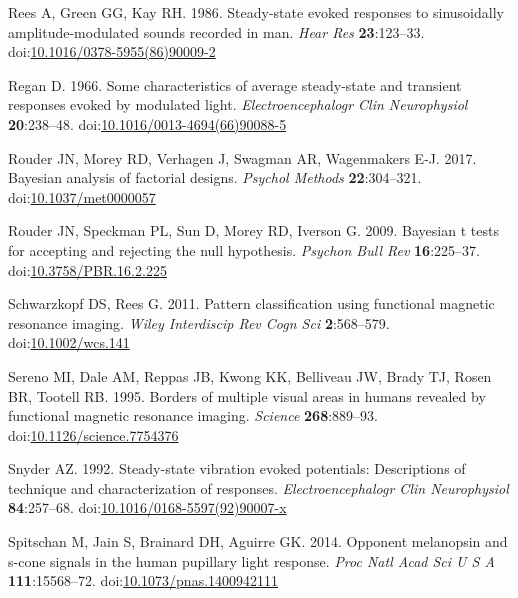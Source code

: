 \documentclass[]{article}
\begin{document}
\leavevmode\hypertarget{ref-Rees1986}{}%
Rees A, Green GG, Kay RH. 1986. Steady-state evoked responses to sinusoidally amplitude-modulated sounds recorded in man. \emph{Hear Res} \textbf{23}:123--33. doi:\href{https://doi.org/10.1016/0378-5955(86)90009-2}{10.1016/0378-5955(86)90009-2}

\leavevmode\hypertarget{ref-Regan1966}{}%
Regan D. 1966. Some characteristics of average steady-state and transient responses evoked by modulated light. \emph{Electroencephalogr Clin Neurophysiol} \textbf{20}:238--48. doi:\href{https://doi.org/10.1016/0013-4694(66)90088-5}{10.1016/0013-4694(66)90088-5}

\leavevmode\hypertarget{ref-Rouder2017}{}%
Rouder JN, Morey RD, Verhagen J, Swagman AR, Wagenmakers E-J. 2017. Bayesian analysis of factorial designs. \emph{Psychol Methods} \textbf{22}:304--321. doi:\href{https://doi.org/10.1037/met0000057}{10.1037/met0000057}

\leavevmode\hypertarget{ref-Rouder2009}{}%
Rouder JN, Speckman PL, Sun D, Morey RD, Iverson G. 2009. Bayesian t tests for accepting and rejecting the null hypothesis. \emph{Psychon Bull Rev} \textbf{16}:225--37. doi:\href{https://doi.org/10.3758/PBR.16.2.225}{10.3758/PBR.16.2.225}

\leavevmode\hypertarget{ref-Schwarzkopf2011}{}%
Schwarzkopf DS, Rees G. 2011. Pattern classification using functional magnetic resonance imaging. \emph{Wiley Interdiscip Rev Cogn Sci} \textbf{2}:568--579. doi:\href{https://doi.org/10.1002/wcs.141}{10.1002/wcs.141}

\leavevmode\hypertarget{ref-Sereno1995}{}%
Sereno MI, Dale AM, Reppas JB, Kwong KK, Belliveau JW, Brady TJ, Rosen BR, Tootell RB. 1995. Borders of multiple visual areas in humans revealed by functional magnetic resonance imaging. \emph{Science} \textbf{268}:889--93. doi:\href{https://doi.org/10.1126/science.7754376}{10.1126/science.7754376}

\leavevmode\hypertarget{ref-Snyder1992}{}%
Snyder AZ. 1992. Steady-state vibration evoked potentials: Descriptions of technique and characterization of responses. \emph{Electroencephalogr Clin Neurophysiol} \textbf{84}:257--68. doi:\href{https://doi.org/10.1016/0168-5597(92)90007-x}{10.1016/0168-5597(92)90007-x}

\leavevmode\hypertarget{ref-Spitschan2014}{}%
Spitschan M, Jain S, Brainard DH, Aguirre GK. 2014. Opponent melanopsin and s-cone signals in the human pupillary light response. \emph{Proc Natl Acad Sci U S A} \textbf{111}:15568--72. doi:\href{https://doi.org/10.1073/pnas.1400942111}{10.1073/pnas.1400942111}
\end{document}
